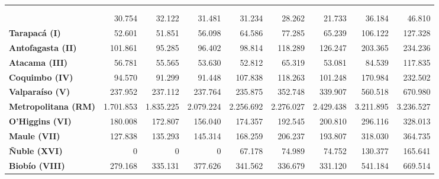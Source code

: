 \documentclass[
  letterpaper,
  DIV=11,
  numbers=noendperiod]{scrartcl}
\begin{document}
\begin{table}
\begin{tabular*}{\linewidth}{@{\extracolsep{\fill}}l|rrrrrrrr}
\midrule\addlinespace[2.5pt]
\multicolumn{9}{l}{{\bfseries Licencias médicas autorizadas según region y seguro de salud (ambos sexos)}} \\[2.5pt] 
\midrule\addlinespace[2.5pt]
{\bfseries \fontsize{0}{0}\selectfont \textcolor[HTML]{rgba(255,255,255,0)}{​}} & {\fontsize{0}{0}\selectfont \textcolor[HTML]{rgba(255,255,255,0)}{}} & {\fontsize{0}{0}\selectfont \textcolor[HTML]{rgba(255,255,255,0)}{}} & {\fontsize{0}{0}\selectfont \textcolor[HTML]{rgba(255,255,255,0)}{}} & {\fontsize{0}{0}\selectfont \textcolor[HTML]{rgba(255,255,255,0)}{}} & {\fontsize{0}{0}\selectfont \textcolor[HTML]{rgba(255,255,255,0)}{}} & {\fontsize{0}{0}\selectfont \textcolor[HTML]{rgba(255,255,255,0)}{}} & {\fontsize{0}{0}\selectfont \textcolor[HTML]{rgba(255,255,255,0)}{}} & {\fontsize{0}{0}\selectfont \textcolor[HTML]{rgba(255,255,255,0)}{}} \\ 
\midrule\addlinespace[2.5pt]
\multicolumn{9}{l}{{\bfseries FONASA​}} \\[2.5pt] 
\midrule\addlinespace[2.5pt]
{\bfseries Arica y Parinacota (XV)} & 30.754 & 32.122 & 31.481 & 31.234 & 28.262 & 21.733 & 36.184 & 46.810 \\ 
{\bfseries Tarapacá (I)} & 52.601 & 51.851 & 56.098 & 64.586 & 77.285 & 65.239 & 106.122 & 127.328 \\ 
{\bfseries Antofagasta (II)} & 101.861 & 95.285 & 96.402 & 98.814 & 118.289 & 126.247 & 203.365 & 234.236 \\ 
{\bfseries Atacama (III)} & 56.781 & 55.565 & 53.630 & 52.812 & 65.319 & 53.081 & 84.539 & 117.835 \\ 
{\bfseries Coquimbo (IV)} & 94.570 & 91.299 & 91.448 & 107.838 & 118.263 & 101.248 & 170.984 & 232.502 \\ 
{\bfseries Valparaíso (V)} & 237.952 & 237.112 & 237.764 & 235.875 & 352.748 & 339.907 & 560.518 & 670.980 \\ 
{\bfseries Metropolitana (RM)} & 1.701.853 & 1.835.225 & 2.079.224 & 2.256.692 & 2.276.027 & 2.429.438 & 3.211.895 & 3.236.527 \\ 
{\bfseries O'Higgins (VI)} & 180.008 & 172.807 & 156.040 & 174.357 & 192.545 & 200.810 & 296.116 & 328.013 \\ 
{\bfseries Maule (VII)} & 127.838 & 135.293 & 145.314 & 168.259 & 206.237 & 193.807 & 318.030 & 364.735 \\ 
{\bfseries Ñuble (XVI)} & 0 & 0 & 0 & 67.178 & 74.989 & 74.752 & 130.377 & 165.641 \\ 
{\bfseries Biobío (VIII)} & 279.168 & 335.131 & 377.626 & 341.562 & 336.679 & 331.120 & 541.184 & 669.514 \\ 

\end{tabular*}
\end{table}
\end{document}
